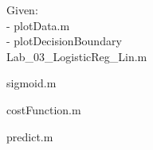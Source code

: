 \documentclass[10pt, a4paper]{article}
\begin{document}
Given:\\
- plotData.m\\
- plotDecisionBoundary\\


Lab\_03\_LogisticReg\_Lin.m


\newpage
sigmoid.m


costFunction.m


predict.m

\end{document}
